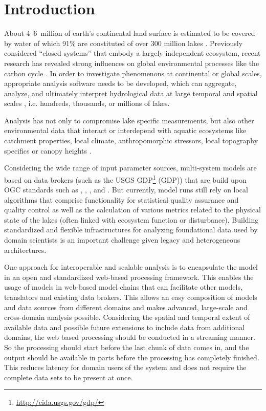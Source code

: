 
\chapter{Introduction}

About \unit{4.6 million}{\kilo\square\metre} of earth's continental land surface is estimated to be covered by water of which 91\% are constituted of over 300 million lakes \citep{downing2006global}. Previously considered ``closed systems'' that embody a largely independent ecosystem, recent research has revealed strong influences on global environmental processes like the carbon cycle \citep{cole2007plumbing}. In order to investigate phenomenons at continental or global scales, appropriate analysis software needs to be developed, which can aggregate, analyze, and ultimately interpret hydrological data at large temporal and spatial scales \citep{read2013upscaling}, i.e. hundreds, thousands, or millions of lakes.

Analysis has not only to compromise lake specific measurements, but also other environmental data that interact or interdepend with aquatic ecosystems like catchment properties, local climate, anthropomorphic stressors, local topography specifics or canopy heights \citep{read2013upscaling}.

Considering the wide range of input parameter sources, multi-system models are based on data brokers (such as the \ac{USGS} \acl{GDP}\footnote{\url{http://cida.usgs.gov/gdp/}} (\acs{GDP})) that are build upon \ac{OGC} standards such as , , ,  and . But currently, model runs still rely on local algorithms that comprise functionality for statistical quality assurance and quality control as well as the calculation of various metrics related to the physical state of the lakes (often linked with ecosystem function or disturbance). Building standardized and flexible infrastructures for analyzing foundational data used by domain scientists is an important challenge given legacy and heterogeneous architectures.

One approach for interoperable and scalable analysis is to encapsulate the model in an open and standardized web-based processing framework. This enables the usage of models in web-based model chains that can facilitate other models, translators and existing data brokers. This allows an easy composition of models and data sources from different domains and makes advanced, large-scale and cross-domain analysis possible. Considering the spatial and temporal extent of available data and possible future extensions to include data from additional domains, the web based processing should be conducted in a streaming manner. So the processing should start before the last chunk of data comes in, and the output should be available in parts before the processing has completely finished. This reduces latency for domain users of the system and does not require the complete data sets to be present at once.

